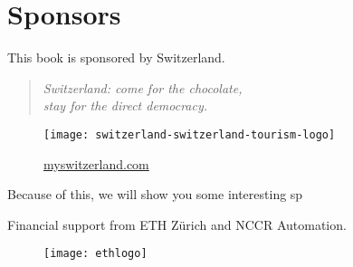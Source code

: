 \section{Sponsors}

This book is sponsored by Switzerland.

\begin{quote}
	\itshape
	Switzerland: come for the chocolate,\\
	stay for the direct democracy.
\end{quote}

\begin{figure}[h]
	\centering
	\texttt{[image: switzerland-switzerland-tourism-logo]}

	\href{http://myswitzerland.com}{myswitzerland.com}
\end{figure}

Because of this, we will show you some interesting sp

Financial support from ETH Zürich and NCCR Automation.
\begin{figure}[h]
	\centering
	\texttt{[image: ethlogo]}
\end{figure}

